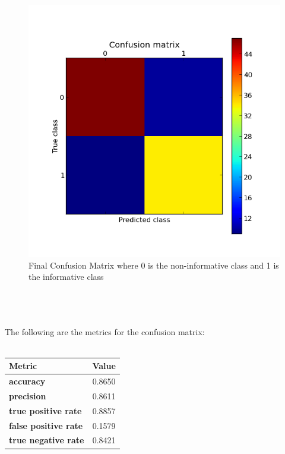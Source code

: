 \documentclass[12pt]{article}
\begin{document}
\begin{figure}[h]
\centering
\includegraphics[width=14cm]{improved_cfm1.png}
\caption{Final Confusion Matrix where 0 is the non-informative class and 1 is the informative class}
\label{fig:cfm2}
\end{figure}\\
\\
\\
The following are the metrics for the confusion matrix: \\
\\
\begin{centering}
\begin{tabular}[b]{l||c} \\
    \textbf{Metric} &\textbf{Value} \\
    \hline 
    \hline
    \textbf{accuracy} &0.8650 \\
    \hline
    \textbf{precision} &0.8611 \\
    \hline
    \textbf{true positive rate} &0.8857 \\
    \hline
    \textbf{false positive rate} &0.1579 \\
    \hline
    \textbf{true negative rate} &0.8421 \\
\end{tabular}
\end{centering}
\\
\end{document}
